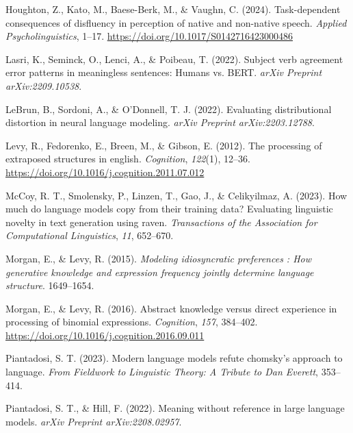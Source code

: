 \documentclass[
  nottoc]{article}
\newlength{\cslhangindent}
\newenvironment{CSLReferences}[2] %
 {\begin{list}{}{%
  \setlength{\itemindent}{0pt}
  \setlength{\leftmargin}{0pt}
  \setlength{\parsep}{0pt}
  \ifodd #1
   \setlength{\leftmargin}{\cslhangindent}
   \setlength{\itemindent}{-1\cslhangindent}
  \fi
  \setlength{\itemsep}{#2\baselineskip}}}
 {\end{list}}
\begin{document}
\begin{CSLReferences}{1}{0}
Houghton, Z., Kato, M., Baese-Berk, M., \& Vaughn, C. (2024).
Task-dependent consequences of disfluency in perception of native and
non-native speech. \emph{Applied Psycholinguistics}, 1--17.
\url{https://doi.org/10.1017/S0142716423000486}

Lasri, K., Seminck, O., Lenci, A., \& Poibeau, T. (2022). Subject verb
agreement error patterns in meaningless sentences: Humans vs. BERT.
\emph{arXiv Preprint arXiv:2209.10538}.

LeBrun, B., Sordoni, A., \& O'Donnell, T. J. (2022). Evaluating
distributional distortion in neural language modeling. \emph{arXiv
Preprint arXiv:2203.12788}.

Levy, R., Fedorenko, E., Breen, M., \& Gibson, E. (2012). The processing
of extraposed structures in english. \emph{Cognition}, \emph{122}(1),
12--36. \url{https://doi.org/10.1016/j.cognition.2011.07.012}

McCoy, R. T., Smolensky, P., Linzen, T., Gao, J., \& Celikyilmaz, A.
(2023). How much do language models copy from their training data?
Evaluating linguistic novelty in text generation using raven.
\emph{Transactions of the Association for Computational Linguistics},
\emph{11}, 652--670.

Morgan, E., \& Levy, R. (2015). \emph{Modeling idiosyncratic preferences
: How generative knowledge and expression frequency jointly determine
language structure}. 1649--1654.

Morgan, E., \& Levy, R. (2016). Abstract knowledge versus direct
experience in processing of binomial expressions. \emph{Cognition},
\emph{157}, 384--402.
\url{https://doi.org/10.1016/j.cognition.2016.09.011}

Piantadosi, S. T. (2023). Modern language models refute chomsky's
approach to language. \emph{From Fieldwork to Linguistic Theory: A
Tribute to Dan Everett}, 353--414.

Piantadosi, S. T., \& Hill, F. (2022). Meaning without reference in
large language models. \emph{arXiv Preprint arXiv:2208.02957}.


\end{CSLReferences}
\end{document}
